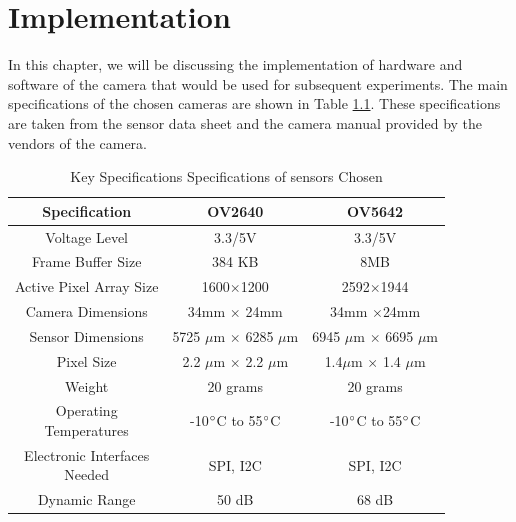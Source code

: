 \chapter{Implementation}
In this chapter, we will be discussing the implementation of hardware and software of the camera that would be used for subsequent experiments.
The main specifications of the chosen cameras are shown in Table \ref{tbl:camera_specs}. These specifications are taken from the sensor data sheet and the camera manual provided by the vendors of the camera\cite{OV2640Arducam}\cite{OV5642Arducam}\cite{OV2640DS}\cite{OV5642DS}.  
\begin{table}[]
\centering
\caption{ Key Specifications Specifications of sensors Chosen}
\label{tbl:camera_specs}
\begin{tabular}{|c|c|c|}
\hline
Specification & OV2640 &  OV5642 \\
\hline
Voltage Level & 3.3/5V &  3.3/5V\\
 \hline
Frame Buffer Size & 384 KB & 8MB \\
 \hline
 Active Pixel Array Size& 1600$\times$1200&  2592$\times$1944 \\
 \hline  
 Camera Dimensions & 34mm $\times$ 24mm & 34mm $\times$24mm\\
 \hline
 Sensor Dimensions & 5725 $\mu$m $\times$ 6285 $\mu$m& 6945 $\mu$m $\times$ 6695 $\mu$m\\
 \hline
 Pixel Size & 2.2 $\mu$m $\times$ 2.2 $\mu$m & 1.4$\mu$m $\times$ 1.4 $\mu$m\\
 \hline
 Weight & 20 grams & 20 grams \\
 \hline
 \makecell{Operating \\Temperatures} & -10$\degree$C to 55$\degree$C & -10$\degree$C to 55$\degree$C \\
 \hline
 \makecell{Electronic Interfaces\\ Needed} & SPI, I2C & SPI, I2C\\
 \hline
 Dynamic Range & 50 dB & 68 dB \\
 \hline
\end{tabular}
\end{table}
